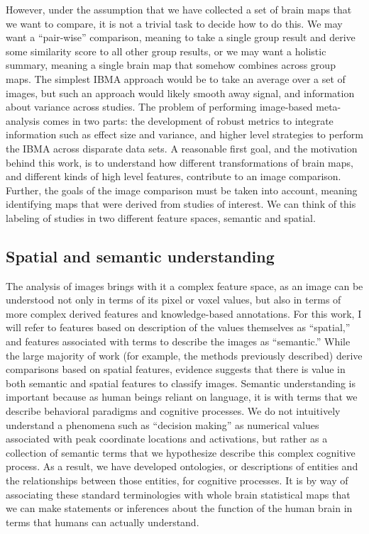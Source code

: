 \documentclass{report}
\begin{document}
However, under the assumption that we have collected a set of brain maps
that we want to compare, it is not a trivial task to decide how to do
this. We may want a ``pair-wise'' comparison, meaning to take a single
group result and derive some similarity score to all other group
results, or we may want a holistic summary, meaning a single brain map
that somehow combines across group maps. The simplest IBMA approach
would be to take an average over a set of images, but such an approach
would likely smooth away signal, and information about variance across
studies. The problem of performing image-based meta-analysis comes in
two parts: the development of robust metrics to integrate information
such as effect size and variance, and higher level strategies to perform
the IBMA across disparate data sets. A reasonable first goal, and the
motivation behind this work, is to understand how different
transformations of brain maps, and different kinds of high level
features, contribute to an image comparison. Further, the goals of the
image comparison must be taken into account, meaning identifying maps
that were derived from studies of interest. We can think of this
labeling of studies in two different feature spaces, semantic and
spatial.

\subsection{Spatial and semantic understanding}

The analysis of images brings with it a complex feature space, as an
image can be understood not only in terms of its pixel or voxel values,
but also in terms of more complex derived features and knowledge-based
annotations. For this work, I will refer to features based on
description of the values themselves as ``spatial,'' and features
associated with terms to describe the images as ``semantic.'' While the
large majority of work (for example, the methods previously described)
derive comparisons based on spatial features, evidence suggests that
there is value in both semantic and spatial features \cite{Sochat2014-wz}
to classify images. Semantic understanding is important because as human
beings reliant on language, it is with terms that we describe behavioral
paradigms and cognitive processes. We do not intuitively understand a
phenomena such as ``decision making'' as numerical values associated
with peak coordinate locations and activations, but rather as a
collection of semantic terms that we hypothesize describe this complex
cognitive process. As a result, we have developed ontologies, or
descriptions of entities and the relationships between those entities,
for cognitive processes. It is by way of associating these standard
terminologies with whole brain statistical maps that we can make
statements or inferences about the function of the human brain in terms
that humans can actually understand.
\end{document}
